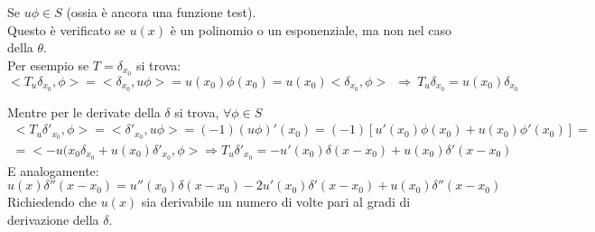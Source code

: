 \documentclass[twoside]{article}
\begin{document}
Se $u\phi \in S$ (ossia è ancora una funzione test).
\\
Questo è verificato se $u(x)$ è un polinomio o un esponenziale, ma non nel caso della $\theta$.
\\
Per esempio se $T=\delta_{x_0}$ si trova:
\begin{equation}
    <T_u \delta_{x_0},\phi>=<\delta_{x_0},u\phi>=u(x_0)\phi(x_0)=u(x_0)<\delta_{x_0},\phi> \ \ \Rightarrow \ T_u \delta_{x_0}=u(x_0)\delta_{x_0}
\end{equation}

Mentre per le derivate della $\delta$ si trova, $\forall \phi \in S$
\begin{equation}
\begin{split}
     <T_u\delta'_{x_0},\phi >=<\delta'_{x_0},u\phi>=(-1)(u\phi)'(x_0)=(-1)[u'(x_0)\phi(x_0)+u(x_0)\phi'(x_0)]=\\
     =<-u(x_0\delta_{x_0}+u(x_0)\delta'_{x_0},\phi> \Longrightarrow T_u\delta'_{x_0}=-u'(x_0)\delta(x-x_0)+u(x_0)\delta'(x-x_0)
\end{split}
\end{equation}
E analogamente:
\begin{equation}
    u(x)\delta''(x-x_0)=u''(x_0)\delta(x-x_0)-2u'(x_0)\delta'(x-x_0)+u(x_0)\delta''(x-x_0)
\end{equation}
Richiedendo che $u(x)$ sia derivabile un numero di volte pari al gradi di derivazione della $\delta$.
\end{document}
